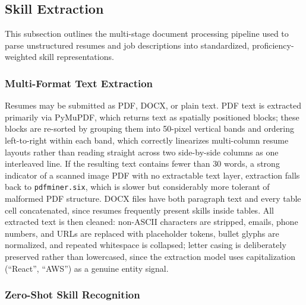 \documentclass[11pt,a4paper]{article}
\newcommand{\code}[1]{\texttt{\footnotesize #1}}
\begin{document}
\subsection{Skill Extraction}
\label{sec:mod2-extraction}

This subsection outlines the multi-stage document processing pipeline used to parse unstructured resumes and job descriptions into standardized, proficiency-weighted skill representations.

\subsubsection{Multi-Format Text Extraction}

Resumes may be submitted as PDF, DOCX, or plain text. PDF text is extracted primarily via PyMuPDF, which returns text as spatially positioned blocks; these blocks are re-sorted by grouping them into 50-pixel vertical bands and ordering left-to-right within each band, which correctly linearizes multi-column resume layouts rather than reading straight across two side-by-side columns as one interleaved line. If the resulting text contains fewer than 30 words, a strong indicator of a scanned image PDF with no extractable text layer, extraction falls back to \code{pdfminer.six}, which is slower but considerably more tolerant of malformed PDF structure. DOCX files have both paragraph text and every table cell concatenated, since resumes frequently present skills inside tables. All extracted text is then cleaned: non-ASCII characters are stripped, emails, phone numbers, and URLs are replaced with placeholder tokens, bullet glyphs are normalized, and repeated whitespace is collapsed; letter casing is deliberately preserved rather than lowercased, since the extraction model uses capitalization (``React'', ``AWS'') as a genuine entity signal.

\subsubsection{Zero-Shot Skill Recognition}
\end{document}
